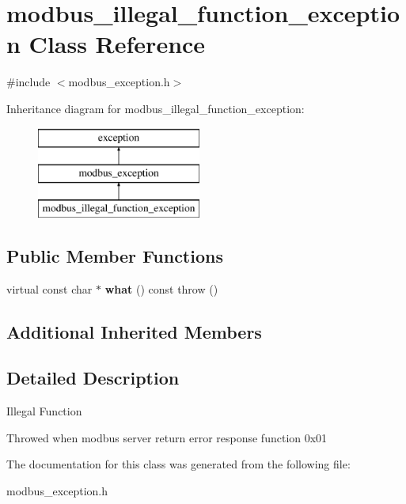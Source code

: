 \hypertarget{classmodbus__illegal__function__exception}{}\section{modbus\+\_\+illegal\+\_\+function\+\_\+exception Class Reference}
\label{classmodbus__illegal__function__exception}


{\ttfamily \#include $<$modbus\+\_\+exception.\+h$>$}

Inheritance diagram for modbus\+\_\+illegal\+\_\+function\+\_\+exception\+:\begin{figure}[H]
\begin{center}
\leavevmode
\includegraphics[height=3.000000cm]{classmodbus__illegal__function__exception}
\end{center}
\end{figure}
\subsection*{Public Member Functions}
\begin{DoxyCompactItemize}
\item 
\mbox{\label{classmodbus__illegal__function__exception_a97a9690c23ef372018206539d70c8fbd}} 
virtual const char $\ast$ {\bfseries what} () const  throw ()
\end{DoxyCompactItemize}
\subsection*{Additional Inherited Members}


\subsection{Detailed Description}
Illegal Function

Throwed when modbus server return error response function 0x01 

The documentation for this class was generated from the following file\+:\begin{DoxyCompactItemize}
\item 
modbus\+\_\+exception.\+h\end{DoxyCompactItemize}
